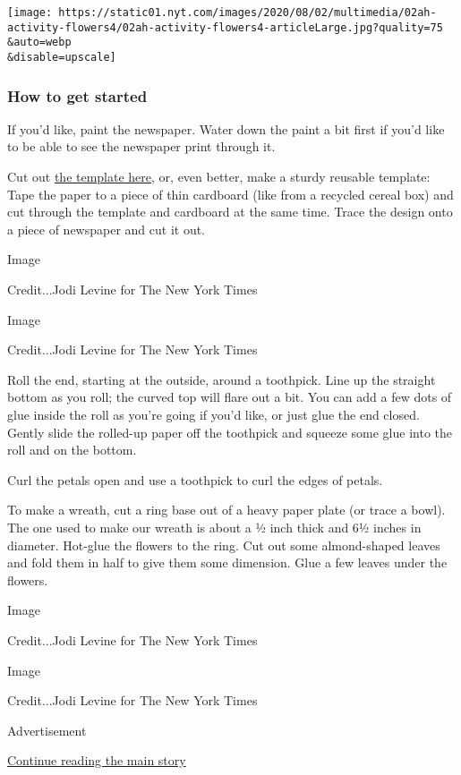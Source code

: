 \texttt{[image: https://static01.nyt.com/images/2020/08/02/multimedia/02ah-activity-flowers4/02ah-activity-flowers4-articleLarge.jpg?quality=75\\\&auto=webp\\\&disable=upscale]}

\hypertarget{how-to-get-started}{%
\subsubsection{How to get started}\label{how-to-get-started}}

If you'd like, paint the newspaper. Water down the paint a bit first if
you'd like to be able to see the newspaper print through it.

Cut out
\href{https://int.nyt.com/data/documenttools/paper-flower-template/ebd2fc94ecae6b22/full.pdf}{the
template here}, or, even better, make a sturdy reusable template: Tape
the paper to a piece of thin cardboard (like from a recycled cereal box)
and cut through the template and cardboard at the same time. Trace the
design onto a piece of newspaper and cut it out.

Image

Credit...Jodi Levine for The New York Times

Image

Credit...Jodi Levine for The New York Times

Roll the end, starting at the outside, around a toothpick. Line up the
straight bottom as you roll; the curved top will flare out a bit. You
can add a few dots of glue inside the roll as you're going if you'd
like, or just glue the end closed. Gently slide the rolled-up paper off
the toothpick and squeeze some glue into the roll and on the bottom.

Curl the petals open and use a toothpick to curl the edges of petals.

To make a wreath, cut a ring base out of a heavy paper plate (or trace a
bowl). The one used to make our wreath is about a ½ inch thick and 6½
inches in diameter. Hot-glue the flowers to the ring. Cut out some
almond-shaped leaves and fold them in half to give them some dimension.
Glue a few leaves under the flowers.

Image

Credit...Jodi Levine for The New York Times

Image

Credit...Jodi Levine for The New York Times

Advertisement

\protect\hyperlink{after-bottom}{Continue reading the main story}

